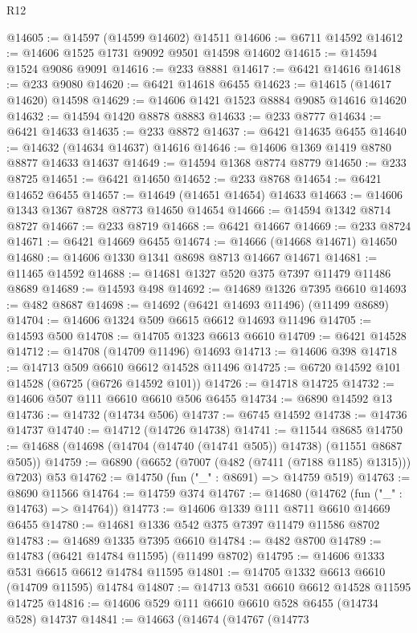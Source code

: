 \begin{lexlean}{R12}
\begin{coremodule}
{{{{{{{{{{{{{{{{{{{{{{{{{{{{{{{{{{{{{{{{{{{{{{{{{{{{{{{{{{{{{{{{{{{{{{{{{{{{{{{{{{@14605 := @14597 (@14599 @14602) @14511
@14606 := @6711 @14592
@14612 := @14606 @1525 @1731 @9092 @9501 @14598 @14602
@14615 := @14594 @1524 @9086 @9091
@14616 := @233 @8881
@14617 := @6421 @14616
@14618 := @233 @9080
@14620 := @6421 @14618 @6455
@14623 := @14615 (@14617 @14620) @14598
@14629 := @14606 @1421 @1523 @8884 @9085 @14616 @14620
@14632 := @14594 @1420 @8878 @8883
@14633 := @233 @8777
@14634 := @6421 @14633
@14635 := @233 @8872
@14637 := @6421 @14635 @6455
@14640 := @14632 (@14634 @14637) @14616
@14646 := @14606 @1369 @1419 @8780 @8877 @14633 @14637
@14649 := @14594 @1368 @8774 @8779
@14650 := @233 @8725
@14651 := @6421 @14650
@14652 := @233 @8768
@14654 := @6421 @14652 @6455
@14657 := @14649 (@14651 @14654) @14633
@14663 := @14606 @1343 @1367 @8728 @8773 @14650 @14654
@14666 := @14594 @1342 @8714 @8727
@14667 := @233 @8719
@14668 := @6421 @14667
@14669 := @233 @8724
@14671 := @6421 @14669 @6455
@14674 := @14666 (@14668 @14671) @14650
@14680 := @14606 @1330 @1341 @8698 @8713 @14667 @14671
@14681 := @11465 @14592
@14688 := @14681 @1327 @520 @375 @7397 @11479 @11486 @8689
@14689 := @14593 @498
@14692 := @14689 @1326 @7395 @6610
@14693 := @482 @8687
@14698 := @14692 (@6421 @14693 @11496) (@11499 @8689)
@14704 := @14606 @1324 @509 @6615 @6612 @14693 @11496
@14705 := @14593 @500
@14708 := @14705 @1323 @6613 @6610
@14709 := @6421 @14528
@14712 := @14708 (@14709 @11496) @14693
@14713 := @14606 @398
@14718 := @14713 @509 @6610 @6612 @14528 @11496
@14725 := @6720 @14592 @101 @14528 (@6725 (@6726 @14592 @101))
@14726 := @14718 @14725
@14732 := @14606 @507 @111 @6610 @6610 @506 @6455
@14734 := @6890 @14592 @13
@14736 := @14732 (@14734 @506)
@14737 := @6745 @14592
@14738 := @14736 @14737
@14740 := @14712 (@14726 @14738)
@14741 := @11544 @8685
@14750 := @14688 (@14698 (@14704 (@14740 (@14741 @505)) @14738) (@11551 @8687 @505))
@14759 := @6890 (@6652 (@7007 (@482 (@7411 (@7188 @1185) @1315))) @7203) @53
@14762 := @14750 (fun ("_" : @8691) => @14759 @519)
@14763 := @8690 @11566
@14764 := @14759 @374
@14767 := @14680 (@14762 (fun ("_" : @14763) => @14764))
@14773 := @14606 @1339 @111 @8711 @6610 @14669 @6455
@14780 := @14681 @1336 @542 @375 @7397 @11479 @11586 @8702
@14783 := @14689 @1335 @7395 @6610
@14784 := @482 @8700
@14789 := @14783 (@6421 @14784 @11595) (@11499 @8702)
@14795 := @14606 @1333 @531 @6615 @6612 @14784 @11595
@14801 := @14705 @1332 @6613 @6610 (@14709 @11595) @14784
@14807 := @14713 @531 @6610 @6612 @14528 @11595 @14725
@14816 := @14606 @529 @111 @6610 @6610 @528 @6455 (@14734 @528) @14737
@14841 := @14663
    (@14674
      (@14767
        (@14773
}}}}}}}}}}}}}}}}}}}}}}}}}}}}}}}}}}}}}}}}}}}}}}}}}}}}}}}}}}}}}}}}}}}}}}}}}}}}}}}}}}
\end{coremodule}
\end{lexlean}
